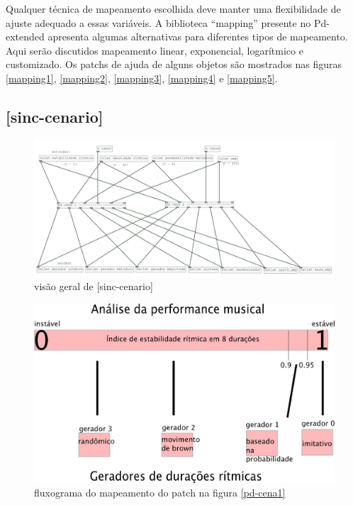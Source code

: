 \documentclass{ppgmus}
\begin{document}
Qualquer técnica de mapeamento escolhida deve manter uma flexibilidade
de ajuste adequado a essas variáveis. A biblioteca ``mapping'' presente no
Pd-extended apresenta algumas alternativas para diferentes tipos de mapeamento.
Aqui serão discutidos mapeamento linear, exponencial, logarítmico e customizado.
Os patchs de ajuda de alguns objetos são mostrados nas figuras \ref{mapping1}, \ref{mapping2},
\ref{mapping3}, \ref{mapping4} e \ref{mapping5}.


\subsection{[sinc-cenario]}

\begin{figure}
\includegraphics[scale=.4]{sinc-cenario}
\caption{visão geral de [sinc-cenario]}
\label{sinc-cenario}
\end{figure}

\begin{figure}
\includegraphics[scale=.4]{tabela-cenario}
\caption{fluxograma do mapeamento do patch na figura \ref{pd-cena1}}
\label{tabela-cenario}
\end{figure}
\end{document}
